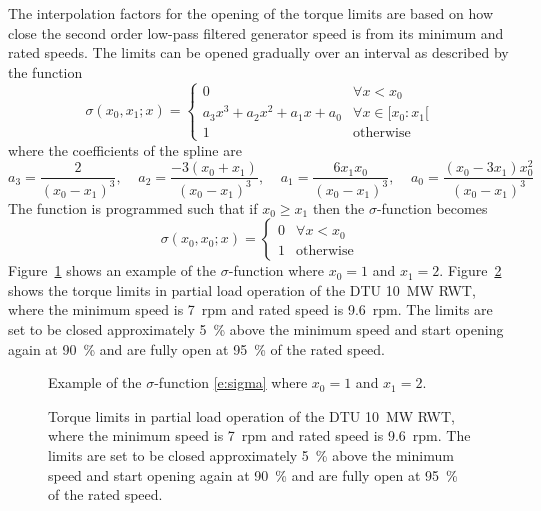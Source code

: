 The interpolation factors for the opening of the torque limits are based on how close the second order low-pass filtered generator speed is from its minimum and rated speeds. The limits can be opened gradually over an interval as described by the function 
\begin{equation}\label{e:sigma}
\sigma\left(x_0,x_1;x\right) = \left\{ 
\begin{array}{rl}
0 & \forall x<x_0 \\
a_3x^3 + a_2x^2 + a_1x + a_0& \forall x\in[x_0:x_1[\\
1 & \mbox{otherwise}
\end{array} \right.
\end{equation}
where the coefficients of the spline are
\begin{equation}\label{e:sigmacoef}
a_3=\frac{2}{\left(x_0-x_1\right)^3}, \;\;\;\;
a_2=\frac{-3 \left(x_0+x_1\right)}{\left(x_0-x_1\right)^3}, \;\;\;\;
a_1=\frac{6 x_1 x_0}{\left(x_0-x_1\right)^3}, \;\;\;\;
a_0=\frac{\left(x_0-3 x_1\right) x_0^2}{\left(x_0-x_1\right)^3}
\end{equation}
The function is programmed such that if $x_0 \geq x_1$ then the $\sigma$-function becomes 
\begin{equation}\label{e:sigma_if}
\sigma\left(x_0,x_0;x\right) = \left\{
\begin{array}{rl}
0 & \forall x<x_0 \\
1 & \mbox{otherwise} 
\end{array} \right.
\end{equation}
Figure~\ref{f:sigma} shows an example of the $\sigma$-function where $x_0=1$ and $x_1=2$. Figure~\ref{f:torque_limits} shows the torque limits in partial load operation of the DTU 10~MW RWT, where the minimum speed is 7~rpm and rated speed is 9.6~rpm. The limits are set to be closed approximately 5~\% above the minimum speed and start opening again at 90~\% and are fully open at 95~\% of the rated speed.

\begin{figure}[b!]
\centerline{ }
\caption{Example of the $\sigma$-function \eqref{e:sigma} where $x_0=1$ and $x_1=2$. \label{f:sigma}}
\end{figure}

\begin{figure}[t]
\centerline{ }
\caption{Torque limits in partial load operation of the DTU 10~MW RWT, where the minimum speed is 7~rpm and rated speed is 9.6~rpm. The limits are set to be closed approximately 5~\% above the minimum speed and start opening again at 90~\% and are fully open at 95~\% of the rated speed. \label{f:torque_limits}}
\end{figure}

